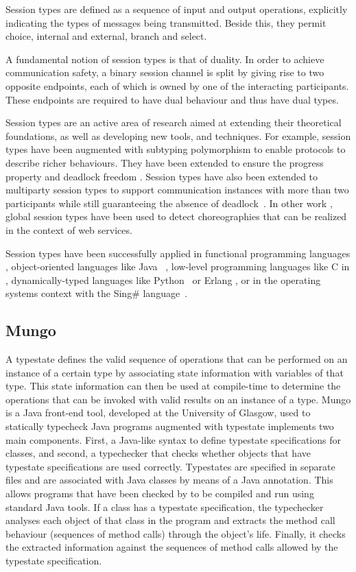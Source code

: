 Session types are defined as a sequence of input and output operations, explicitly indicating the types of messages being transmitted. Beside this, they permit choice, internal and external, branch and select.

A fundamental notion of session types is that of duality. In order to achieve communication safety, a binary session channel is split by giving rise to two opposite endpoints, each of which is owned by one of the interacting participants. These endpoints are required to have dual behaviour and thus have dual types.

Session types are an active area of research aimed at extending their theoretical foundations, as well as developing new tools, and techniques. For example, session types have been augmented with subtyping polymorphism to enable protocols to describe richer behaviours\cite{GaySJ:substp}.
They have been extended to ensure the progress property and deadlock freedom \cite{dyl08}. Session types have also been extended to multiparty session types to support communication instances with more than two participants while still guaranteeing the absence of deadlock~\cite{HondaK:mulast}. In other work \cite{ch07}, global session types have been used to detect choreographies that can be realized in the context of web services.

Session types have been successfully applied in functional programming languages \cite{VasconcelosVT:sestfm}, object-oriented languages like Java ~\cite{HuR:sesbdp, gay.vasconcelos.etal_modular-session-types}, low-level programming languages like C in \cite{NgYH12}, dynamically-typed languages like Python~\cite{DBLP:conf/rv/NeykovaYH13} or Erlang \cite{erlang},  or in the operating systems context with the Sing\# language~\cite{FahndrichM:lansfr}.

\subsection{Mungo}
A typestate defines the valid sequence of operations that can be performed on an instance of a certain type by associating state information with variables of that type. This state information can then be used at compile-time to determine the operations that can be invoked with valid results on an instance of a type.
Mungo\cite{kouzapas16} is a Java front-end tool, developed at the University of Glasgow, used to statically typecheck Java programs augmented with typestate
\Mungo implements two main components. First, a Java-like syntax to define
typestate specifications for classes, and second, a typechecker
that checks whether objects that have typestate specifications are used correctly. Typestates are specified in separate files and
are associated with Java classes by means of a Java
annotation. This allows programs that have been
checked by \Mungo to be compiled and run using standard
Java tools. If a class has a typestate specification, the \Mungo typechecker analyses each object of that class in the program and extracts the
method call behaviour (sequences of method calls) through the object's life. Finally, it checks the extracted information against
the sequences of method calls allowed by the typestate specification.

